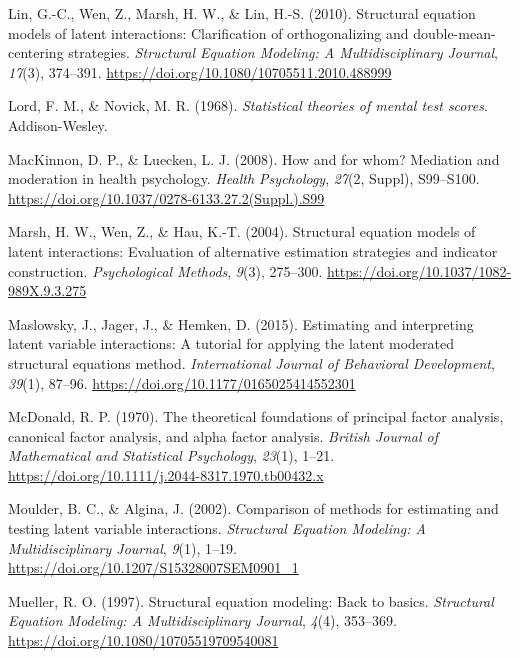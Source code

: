 \documentclass[
  man]{apa6}
\newlength{\cslhangindent}
\newenvironment{CSLReferences}[2] %
 {\begin{list}{}{%
  \setlength{\itemindent}{0pt}
  \setlength{\leftmargin}{0pt}
  \setlength{\parsep}{0pt}
  \ifodd #1
   \setlength{\leftmargin}{\cslhangindent}
   \setlength{\itemindent}{-1\cslhangindent}
  \fi
  \setlength{\itemsep}{#2\baselineskip}}}
 {\end{list}}
\begin{document}
\begin{CSLReferences}{1}{0}
Lin, G.-C., Wen, Z., Marsh, H. W., \& Lin, H.-S. (2010). Structural equation models of latent interactions: {Clarification} of orthogonalizing and double-mean-centering strategies. \emph{Structural Equation Modeling: A Multidisciplinary Journal}, \emph{17}(3), 374--391. \url{https://doi.org/10.1080/10705511.2010.488999}

Lord, F. M., \& Novick, M. R. (1968). \emph{Statistical theories of mental test scores}. Addison-Wesley.

MacKinnon, D. P., \& Luecken, L. J. (2008). How and for whom? Mediation and moderation in health psychology. \emph{Health Psychology}, \emph{27}(2, Suppl), S99--S100. \url{https://doi.org/10.1037/0278-6133.27.2(Suppl.).S99}

Marsh, H. W., Wen, Z., \& Hau, K.-T. (2004). Structural equation models of latent interactions: Evaluation of alternative estimation strategies and indicator construction. \emph{Psychological Methods}, \emph{9}(3), 275--300. \url{https://doi.org/10.1037/1082-989X.9.3.275}

Maslowsky, J., Jager, J., \& Hemken, D. (2015). Estimating and interpreting latent variable interactions: A tutorial for applying the latent moderated structural equations method. \emph{International Journal of Behavioral Development}, \emph{39}(1), 87--96. \url{https://doi.org/10.1177/0165025414552301}

McDonald, R. P. (1970). The theoretical foundations of principal factor analysis, canonical factor analysis, and alpha factor analysis. \emph{British Journal of Mathematical and Statistical Psychology}, \emph{23}(1), 1--21. \url{https://doi.org/10.1111/j.2044-8317.1970.tb00432.x}

Moulder, B. C., \& Algina, J. (2002). Comparison of methods for estimating and testing latent variable interactions. \emph{Structural Equation Modeling: A Multidisciplinary Journal}, \emph{9}(1), 1--19. \url{https://doi.org/10.1207/S15328007SEM0901_1}

Mueller, R. O. (1997). Structural equation modeling: Back to basics. \emph{Structural Equation Modeling: A Multidisciplinary Journal}, \emph{4}(4), 353--369. \url{https://doi.org/10.1080/10705519709540081}


\end{CSLReferences}
\end{document}
